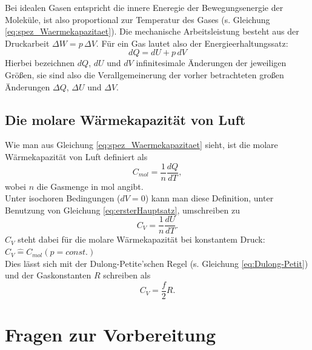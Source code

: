 Bei idealen Gasen entspricht die innere Eneregie der Bewegungsenergie der Moleküle, ist also proportional zur Temperatur des Gases (s. Gleichung \ref{eq:spez_Waermekapazitaet}). Die mechanische Arbeitsleistung besteht aus der Druckarbeit $\Delta W = p\,\Delta V$. Für ein Gas lautet also der Energieerhaltungssatz:
\begin{equation} \label{eq:ersterHauptsatz}
	dQ = dU + p\,dV
\end{equation}
Hierbei bezeichnen $dQ$, $dU$ und $dV$ infinitesimale Änderungen der jeweiligen Größen, sie sind also die Verallgemeinerung der vorher betrachteten großen Änderungen $\Delta Q$, $\Delta U$ und $\Delta V$.

\subsection{Die molare Wärmekapazität von Luft}

Wie man aus Gleichung \ref{eq:spez_Waermekapazitaet} sieht, ist die molare Wärmekapazität von Luft definiert als
\begin{equation}
	C_{mol} = \frac{1}{n}\frac{dQ}{dT},
\end{equation}
wobei $n$ die Gasmenge in mol angibt.\\
Unter isochoren Bedingungen ($dV = 0$) kann man diese Definition, unter Benutzung von Gleichung \ref{eq:ersterHauptsatz}, umschreiben zu
\begin{equation}
	C_V = \frac{1}{n}\frac{dU}{dT}.
\end{equation}
$C_V$ steht dabei für die molare Wärmekapazität bei konstantem Druck: $C_V \hat{=} C_{mol}(p=const.)$\\
Dies lässt sich mit der Dulong-Petite'schen Regel (s. Gleichung \ref{eq:Dulong-Petit}) und der Gaskonstanten $R$ schreiben als
\begin{equation}
	C_V = \frac{f}{2}R.
\end{equation}

\section{Fragen zur Vorbereitung}

